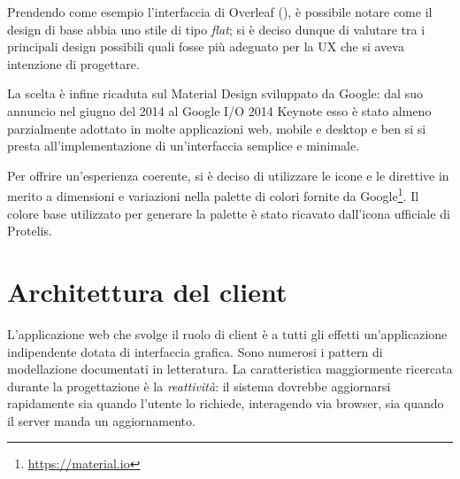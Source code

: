       Prendendo come esempio l'interfaccia di Overleaf (), è possibile notare come il design di base abbia uno stile di tipo \emph{flat};
      si è deciso dunque di valutare tra i principali design possibili quali fosse più adeguato per la UX che si aveva intenzione di progettare.

      La scelta è infine ricaduta sul Material Design sviluppato da Google:
      dal suo annuncio nel giugno del 2014 al Google I/O 2014 Keynote esso è stato almeno parzialmente adottato in molte applicazioni web, mobile e desktop
      e ben si si presta all'implementazione di un'interfaccia semplice e minimale. %

      Per offrire un'esperienza coerente, si è deciso di utilizzare le icone e le direttive in merito a dimensioni e variazioni nella palette di colori fornite da Google\footnote{\url{https://material.io}}.
      Il colore base utilizzato per generare la palette è stato ricavato dall'icona ufficiale di Protelis. %

  \section{Architettura del client}\label{sec:arch:client}

    L'applicazione web che svolge il ruolo di client è a tutti gli effetti un'applicazione indipendente dotata di interfaccia grafica.
    Sono numerosi i pattern di modellazione documentati in letteratura.
    La caratteristica maggiormente ricercata durante la progettazione è la \emph{reattività}:
    il sistema dovrebbe aggiornarsi rapidamente sia quando l'utente lo richiede, interagendo via browser, sia quando il server manda un aggiornamento.



